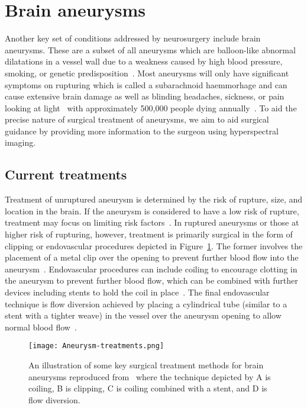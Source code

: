 \section{Brain aneurysms}\label{sec:aneurysms}
Another key set of conditions addressed by neurosurgery include brain aneurysms. These are a subset of all aneurysms which are balloon-like abnormal dilatations in a vessel wall due to a weakness caused by high blood pressure, smoking, or genetic predisposition~\citep{NationalHealthService2022}. Most aneurysms will only have significant symptoms on rupturing which is called a subarachnoid haemmorhage and can cause extensive brain damage as well as blinding headaches, sickness, or pain looking at light~\citep{NationalHealthService2022} with approximately 500,000 people dying annually~\citep{Toth2018}. To aid the precise nature of surgical treatment of aneurysms, we aim to aid surgical guidance by providing more information to the surgeon using hyperspectral imaging. 

\subsection{Current treatments}\label{sec:introaneurysmtreatments}
Treatment of unruptured aneurysm is determined by the risk of rupture, size, and location in the brain. If the aneurysm is considered to have a low risk of rupture, treatment may focus on limiting risk factors~\citep{NationalHealthService2022}. In ruptured aneurysms or those at higher risk of rupturing, however, treatment is primarily surgical in the form of clipping or endovascular procedures depicted in Figure~\ref{fig:aneurysmtreatment}. The former involves the placement of a metal clip over the opening to prevent further blood flow into the aneurysm~\citep{TheBrainFoundation2023}. Endovascular procedures can include coiling to encourage clotting in the aneurysm to prevent further blood flow, which can be combined with further devices including stents to hold the coil in place~\citep{TheBrainFoundation2023}. The final endovascular technique is flow diversion achieved by placing a cylindrical tube (similar to a stent with a tighter weave) in the vessel over the aneurysm opening to allow normal blood flow~\citep{TheBrainFoundation2023}. 
\begin{figure}[h]
    \centering
    \texttt{[image: Aneurysm-treatments.png]}
    \caption{An illustration of some key surgical treatment methods for brain aneurysms reproduced from~\citep{TheBrainFoundation2023} where the technique depicted by A is coiling, B is clipping, C is coiling combined with a stent, and D is flow diversion.}
    \label{fig:aneurysmtreatment}
\end{figure}

